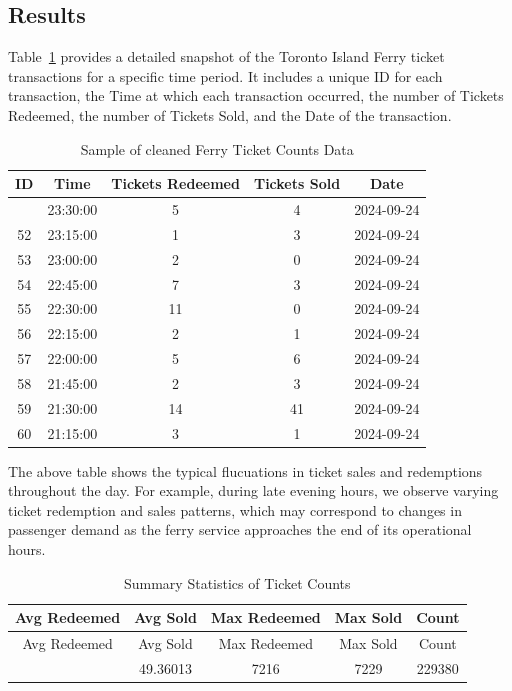 \documentclass[
  letterpaper,
  DIV=11,
  numbers=noendperiod]{scrartcl}
\begin{document}
\subsection{Results}\label{sec-data-resultsk}

Table~\ref{tbl-cleaned_data} provides a detailed snapshot of the Toronto
Island Ferry ticket transactions for a specific time period. It includes
a unique ID for each transaction, the Time at which each transaction
occurred, the number of Tickets Redeemed, the number of Tickets Sold,
and the Date of the transaction.

\begin{longtable}[]{@{}ccccc@{}}

\caption{\label{tbl-cleaned_data}Sample of cleaned Ferry Ticket Counts
Data}

\tabularnewline

\toprule\noalign{}
ID & Time & Tickets Redeemed & Tickets Sold & Date \\
\midrule\noalign{}
\endhead
\bottomrule\noalign{}
\endlastfoot
51 & 23:30:00 & 5 & 4 & 2024-09-24 \\
52 & 23:15:00 & 1 & 3 & 2024-09-24 \\
53 & 23:00:00 & 2 & 0 & 2024-09-24 \\
54 & 22:45:00 & 7 & 3 & 2024-09-24 \\
55 & 22:30:00 & 11 & 0 & 2024-09-24 \\
56 & 22:15:00 & 2 & 1 & 2024-09-24 \\
57 & 22:00:00 & 5 & 6 & 2024-09-24 \\
58 & 21:45:00 & 2 & 3 & 2024-09-24 \\
59 & 21:30:00 & 14 & 41 & 2024-09-24 \\
60 & 21:15:00 & 3 & 1 & 2024-09-24 \\

\end{longtable}

The above table shows the typical flucuations in ticket sales and
redemptions throughout the day. For example, during late evening hours,
we observe varying ticket redemption and sales patterns, which may
correspond to changes in passenger demand as the ferry service
approaches the end of its operational hours.

\begin{longtable}[]{@{}ccccc@{}}
\caption{Summary Statistics of Ticket
Counts}\label{tbl-summary_stats}\tabularnewline
\toprule\noalign{}
Avg Redeemed & Avg Sold & Max Redeemed & Max Sold & Count \\
\midrule\noalign{}
\endfirsthead
\toprule\noalign{}
Avg Redeemed & Avg Sold & Max Redeemed & Max Sold & Count \\
\midrule\noalign{}
\endhead
\bottomrule\noalign{}
\endlastfoot
48.44548 & 49.36013 & 7216 & 7229 & 229380 \\
\end{longtable}
\end{document}
